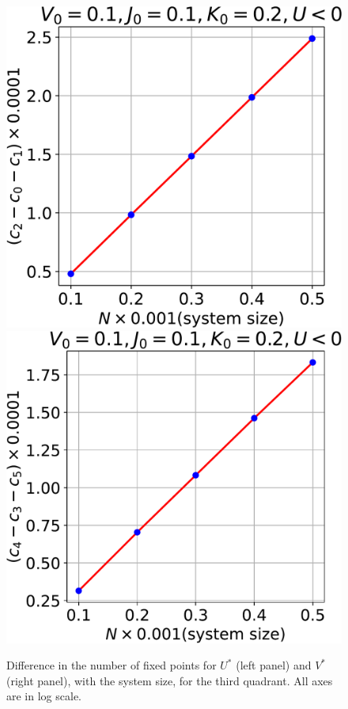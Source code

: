 \documentclass[12pt,twoside]{article}
\numberwithin{equation}{section}
\begin{document}
\begin{figure}[htpb!]
\centering
\includegraphics[scale=0.39]{../figures/frac_vs_D_quad3.pdf}
\includegraphics[scale=0.39]{../figures/frac_vs_D_quad33.pdf}
\caption{Difference in the number of fixed points for $U^*$ (left panel) and \(V^*\) (right panel), with the system size, for the third quadrant. All axes are in log scale.}
\label{frac_q3}
\end{figure}
\end{document}
